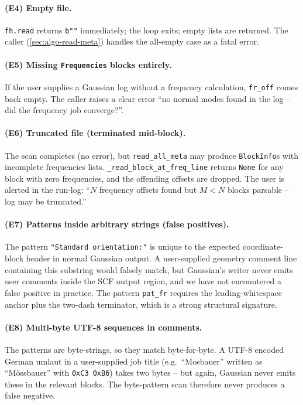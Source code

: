 \documentclass[10pt,a4paper,twoside]{article}
\newcommand{\fn}[1]{\texttt{#1}}
\begin{document}
\paragraph{(E4) Empty file.}
\texttt{fh.read} returns \texttt{b""} immediately; the loop exits;
empty lists are returned. The caller (\cref{sec:algo-read-meta})
handles the all-empty case as a fatal error.

\paragraph{(E5) Missing \texttt{Frequencies} blocks entirely.}
If the user supplies a Gaussian log without a frequency calculation,
\texttt{fr\_off} comes back empty. The caller raises a clear error
``no normal modes found in the log -- did the frequency job
converge?''.

\paragraph{(E6) Truncated file (terminated mid-block).}
The scan completes (no error), but \fn{read\_all\_meta} may
produce \fn{BlockInfo}s with incomplete frequencies lists.
\fn{\_read\_block\_at\_freq\_line} returns \texttt{None} for any
block with zero frequencies, and the offending offsets are
dropped. The user is alerted in the run-log: ``$N$ frequency
offsets found but $M < N$ blocks parsable -- log may be truncated.''

\paragraph{(E7) Patterns inside arbitrary strings (false positives).}
The pattern \texttt{"Standard orientation:"} is unique to the
expected coordinate-block header in normal Gaussian output. A
user-supplied geometry comment line containing this substring
would falsely match, but Gaussian's writer never emits user
comments inside the SCF output region, and we have not
encountered a false positive in practice. The pattern
\texttt{pat\_fr} requires the leading-whitespace anchor plus the
two-dash terminator, which is a strong structural signature.

\paragraph{(E8) Multi-byte UTF-8 sequences in comments.}
The patterns are byte-strings, so they match byte-for-byte. A
UTF-8 encoded German umlaut in a user-supplied job title (e.g.\
``Mosbauer'' written as ``Mössbauer'' with \texttt{0xC3 0xB6})
takes two bytes -- but again, Gaussian never emits these in the
relevant blocks. The byte-pattern scan therefore never produces a
false negative.
\end{document}
